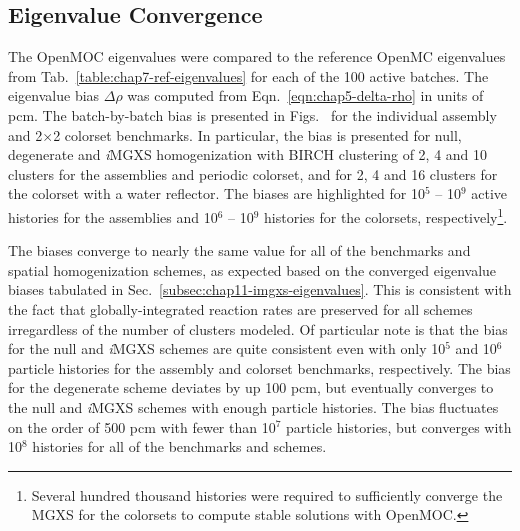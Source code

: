 \subsection{Eigenvalue Convergence}
\label{subsec:chap11-eigenvalue-converge}

The OpenMOC eigenvalues were compared to the reference OpenMC eigenvalues from Tab.~\ref{table:chap7-ref-eigenvalues} for each of the 100 active batches. The eigenvalue bias $\Delta\rho$ was computed from Eqn.~\ref{eqn:chap5-delta-rho} in units of \ac{pcm}. The batch-by-batch bias is presented in Figs.~ for the individual assembly and 2$\times$2 colorset benchmarks. In particular, the bias is presented for null, degenerate and \textit{i}\ac{MGXS} homogenization with BIRCH clustering of 2, 4 and 10 clusters for the assemblies and periodic colorset, and for 2, 4 and 16 clusters for the colorset with a water reflector. The biases are highlighted for 10$^{5}$ -- 10$^{9}$ active histories for the assemblies and 10$^{6}$ -- 10$^{9}$ histories for the colorsets, respectively\footnote{\label{converge}Several hundred thousand histories were required to sufficiently converge the \ac{MGXS} for the colorsets to compute stable solutions with OpenMOC.}.

The biases converge to nearly the same value for all of the benchmarks and spatial homogenization schemes, as expected based on the converged eigenvalue biases tabulated in Sec.~\ref{subsec:chap11-imgxs-eigenvalues}. This is consistent with the fact that globally-integrated reaction rates are preserved for all schemes irregardless of the number of clusters modeled. Of particular note is that the bias for the null and \textit{i}\ac{MGXS} schemes are quite consistent even with only 10$^{5}$ and 10$^{6}$ particle histories for the assembly and colorset benchmarks, respectively. The bias for the degenerate scheme deviates by up 100 \ac{pcm}, but eventually converges to the null and \textit{i}\ac{MGXS} schemes with enough particle histories. The bias fluctuates on the order of 500 \ac{pcm} with fewer than 10$^{7}$ particle histories, but converges with 10$^{8}$ histories for all of the benchmarks and schemes.

